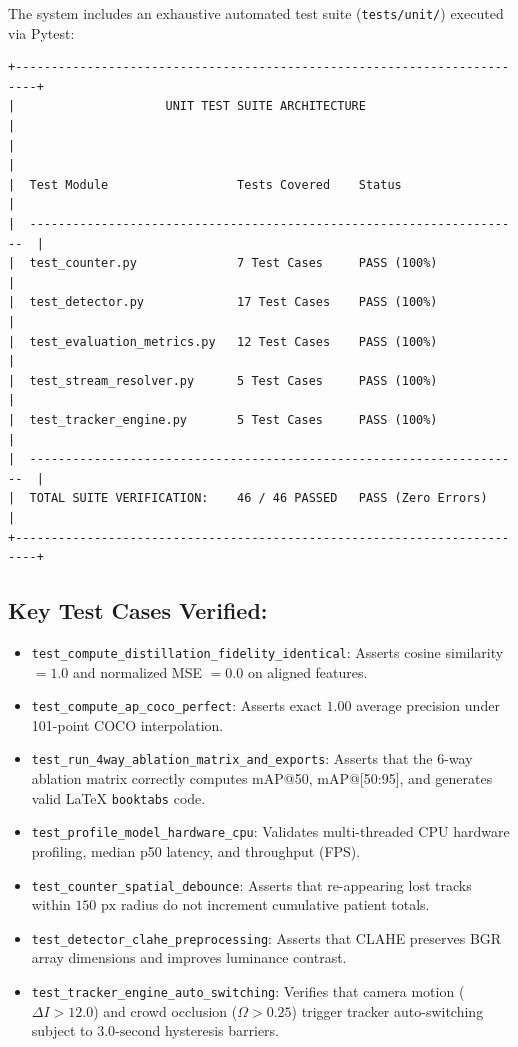 The system includes an exhaustive automated test suite
(\texttt{tests/unit/}) executed via Pytest:

\begin{verbatim}
+-------------------------------------------------------------------------+
|                     UNIT TEST SUITE ARCHITECTURE                        |
|                                                                         |
|  Test Module                  Tests Covered    Status                   |
|  ---------------------------------------------------------------------  |
|  test_counter.py              7 Test Cases     PASS (100%)              |
|  test_detector.py             17 Test Cases    PASS (100%)              |
|  test_evaluation_metrics.py   12 Test Cases    PASS (100%)              |
|  test_stream_resolver.py      5 Test Cases     PASS (100%)              |
|  test_tracker_engine.py       5 Test Cases     PASS (100%)              |
|  ---------------------------------------------------------------------  |
|  TOTAL SUITE VERIFICATION:    46 / 46 PASSED   PASS (Zero Errors)       |
+-------------------------------------------------------------------------+
\end{verbatim}

\subsection{Key Test Cases Verified:}\label{key-test-cases-verified}

\begin{itemize}
\tightlist
\item
  \texttt{test\_compute\_distillation\_fidelity\_identical}: Asserts
  cosine similarity \(= 1.0\) and normalized MSE \(= 0.0\) on aligned
  features.
\item
  \texttt{test\_compute\_ap\_coco\_perfect}: Asserts exact \(1.00\)
  average precision under 101-point COCO interpolation.
\item
  \texttt{test\_run\_4way\_ablation\_matrix\_and\_exports}: Asserts that
  the 6-way ablation matrix correctly computes mAP@50, mAP@{[}50:95{]},
  and generates valid LaTeX \texttt{booktabs} code.
\item
  \texttt{test\_profile\_model\_hardware\_cpu}: Validates multi-threaded
  CPU hardware profiling, median p50 latency, and throughput (FPS).
\item
  \texttt{test\_counter\_spatial\_debounce}: Asserts that re-appearing
  lost tracks within \(150\text{ px}\) radius do not increment
  cumulative patient totals.
\item
  \texttt{test\_detector\_clahe\_preprocessing}: Asserts that CLAHE
  preserves BGR array dimensions and improves luminance contrast.
\item
  \texttt{test\_tracker\_engine\_auto\_switching}: Verifies that camera
  motion (\(\Delta I > 12.0\)) and crowd occlusion (\(\Omega > 0.25\))
  trigger tracker auto-switching subject to \(3.0\text{-second}\)
  hysteresis barriers.
\end{itemize}
